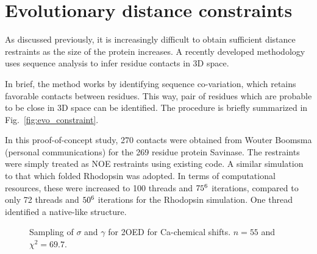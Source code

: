\chapter{Evolutionary distance constraints}

As discussed previously, it is increasingly difficult to obtain sufficient distance restraints as the size of the protein increases.
A recently developed methodology uses sequence analysis to infer residue contacts in 3D space. 

In brief, the method works by identifying sequence co-variation, which retains favorable contacts between residues.
This way, pair of residues which are probable to be close in 3D space can be identified.
The procedure is briefly summarized in Fig.~\ref{fig:evo_constraint}.

In this proof-of-concept study, 270 contacts were obtained from Wouter Boomsma (personal communications) for the 269 residue protein Savinase.
The restraints were simply treated as NOE restraints using existing code.
A similar simulation to that which folded Rhodopsin was adopted. 
In terms of computational resources, these were increased to 100 threads and $75 \time 10^6$ iterations, compared to only 72 threads and $50 \time 10^6$ iterations for the Rhodopsin simulation.
One thread identified a native-like structure.



\begin{figure}%
    \centering
    \caption{Sampling of $\sigma$ and $\gamma$ for 2OED for Ca-chemical shifts. $n = 55$ and $\chi^2 = 69.7$.}
    \label{fig:savinase_fold}%
\end{figure}


